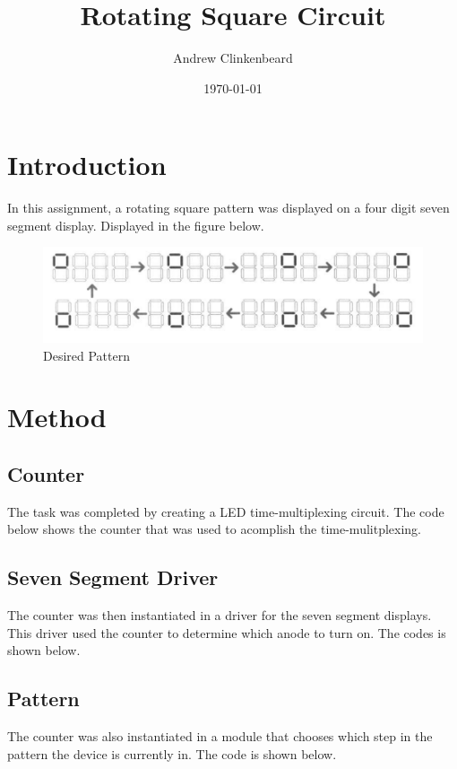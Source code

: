 \documentclass[12pt]{article}
\title{Rotating Square Circuit}
\author{Andrew Clinkenbeard}
\date{\today}
\newcommand{\Verilog}[2][]{%
	
}
\begin{document}
\maketitle
\section{Introduction}

In this assignment, a rotating square pattern was displayed on a four digit seven segment display. Displayed in the figure below.



\begin{figure}[h]\centering
	\includegraphics[width=\textwidth,trim=0cm 0cm 0cm 0cm,clip]{figure1}
	\caption{Desired Pattern}
	\label{Desired Pattern}			%
\end{figure}


\section{Method}
\subsection{Counter}
The task was completed by creating a LED time-multiplexing circuit. The code below shows the counter that was used to acomplish the time-mulitplexing. 
\Verilog[firstline=23]{./mysseg.srcs/sources_1/new/counter.sv}
\subsection{Seven Segment Driver}
The counter was then instantiated in a driver for the seven segment displays. This driver used the counter to determine which anode to turn on. The codes is shown below.
\Verilog[firstline=23]{./mysseg.srcs/sources_1/new/ssegdriver.sv}
\subsection{Pattern}
The counter was also instantiated in a module that chooses which step in the pattern the device is currently in. The code is shown below.
\Verilog[firstline=23]{./mysseg.srcs/sources_1/new/Patterns.sv}
\end{document}
